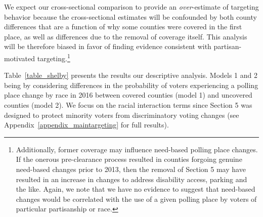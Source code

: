 \documentclass[12pt]{article}
\begin{document}
We expect our cross-sectional comparison to provide an \emph{over}-estimate of targeting behavior because the cross-sectional estimates will be confounded by both county differences that are a function of why some counties were covered in the first place, as well as differences due to the removal of coverage itself.  This analysis will be therefore biased in favor of finding evidence consistent with partisan-motivated targeting.\footnote{Additionally, former coverage may influence need-based polling place changes.  If the onerous pre-clearance process resulted in counties forgoing genuine need-based changes prior to 2013, then the removal of Section 5 may have resulted in an increase in changes to address disability access, parking and the like.  Again, we note that we have no evidence to suggest that need-based changes would be correlated with the use of a given polling place by voters of particular partisanship or race.}


Table~\ref{table_shelby} presents the results our descriptive analysis.  Models 1 and 2 being by considering differences in the probability of voters experiencing a polling place change by race in 2016 between covered counties (model 1) and uncovered counties (model 2). We focus on the racial interaction terms since Section 5 was designed to protect minority voters from discriminatory voting changes (see Appendix~\ref{appendix_maintargeting} for full results).
\end{document}
